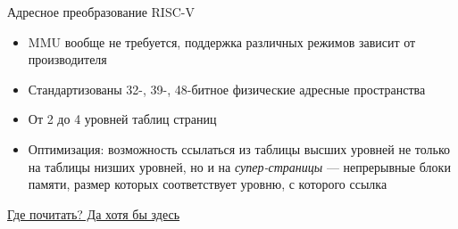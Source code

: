 \documentclass[xetex,aspectratio=43]{beamer}
\begin{document}
\begin{frame}{Адресное преобразование RISC-V}
    \begin{itemize}
        \item MMU вообще не требуется, поддержка различных режимов зависит от производителя
        \item Стандартизованы 32-, 39-, 48-битное физические адресные пространства
        \item От 2 до 4 уровней таблиц страниц
        \item \alert{Оптимизация:} возможность ссылаться из таблицы высших уровней не только на таблицы низших уровней, но и на \emph{супер-страницы} --- непрерывные блоки памяти, размер которых соответствует уровню, с которого ссылка
    \end{itemize}
    \href{https://en.wikipedia.org/wiki/RISC-V\#Privileged_instruction_set}{Где почитать? Да хотя бы здесь}
\end{frame}

\section*{}
\end{document}
